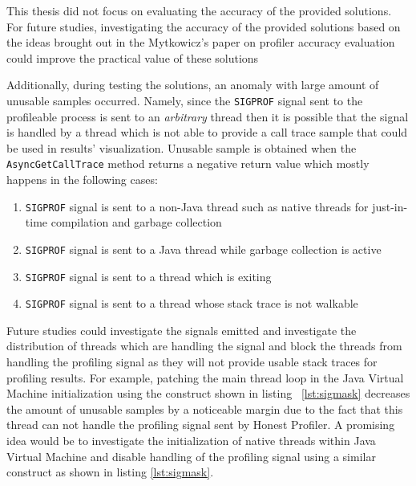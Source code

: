 \documentclass[..thesis.tex]{subfiles}
\begin{document}
This thesis did not focus on evaluating the accuracy of the provided solutions. For future studies, investigating the accuracy of the provided solutions based on the ideas brought out in the Mytkowicz's paper on profiler accuracy evaluation \cite{mytkowicz_evaluating_2010} could improve the practical value of these solutions


Additionally, during testing the solutions, an anomaly with large amount of unusable samples occurred. Namely, since the \texttt{SIGPROF} signal sent to the profileable process is sent to an \textit{arbitrary} thread then it is possible that the signal is handled by a thread which is not able to provide a call trace sample that could be used in results' visualization. Unusable sample is obtained when the \texttt{Async\-Get\-Call\-Trace} method returns a negative return value which mostly happens in the following cases:
\begin{enumerate}
	\item \texttt{SIGPROF} signal is sent to a non-Java thread such as native threads for just-in-time compilation and garbage collection
	\item \texttt{SIGPROF} signal is sent to a Java thread while garbage collection is active
	\item \texttt{SIGPROF} signal is sent to a thread which is exiting
	\item \texttt{SIGPROF} signal is sent to a thread whose stack trace is not walkable
\end{enumerate}

Future studies could investigate the signals emitted and investigate the distribution of threads which are handling the signal and block the threads from handling the profiling signal as they will not provide usable stack traces for profiling results.
For example, patching the main thread loop in the Java Virtual Machine initialization using the construct shown in listing ~\ref{lst:sigmask} decreases the amount of unusable samples by a noticeable margin due to the fact that this thread can not handle the profiling signal sent by Honest Profiler. A promising idea would be to investigate the initialization of native threads within Java Virtual Machine and disable handling of the profiling signal using a similar construct as shown in listing \ref{lst:sigmask}.
\end{document}
